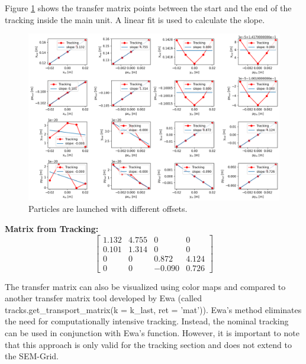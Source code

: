 Figure \ref{fig:transfer_matrix_4} shows the transfer matrix points between the start and the end of the tracking inside the main unit. A linear fit is used to calculate the slope.

\begin{figure}[H]
\centering
\includegraphics[width=1.0\textwidth]{02_Simulation/images/injection_transfer_matrix_4.png}
\caption{Particles are launched with different offsets.}
\label{fig:transfer_matrix_4}
\end{figure}



\textbf{Matrix from Tracking:}
\[
\begin{bmatrix}
1.132 & 4.755 & 0 & 0 \\
0.101 & 1.314 & 0 & 0 \\
0 & 0 & 0.872 & 4.124 \\
0 & 0 & -0.090 & 0.726
\end{bmatrix}
\]

The transfer matrix can also be visualized using color maps and compared to another transfer matrix tool developed by Ewa (called tracks.get\_transport\_matrix(k = k\_last, ret = 'mat')). Ewa's method eliminates the need for computationally intensive tracking. Instead, the nominal tracking can be used in conjunction with Ewa's function. However, it is important to note that this approach is only valid for the tracking section and does not extend to the SEM-Grid.

